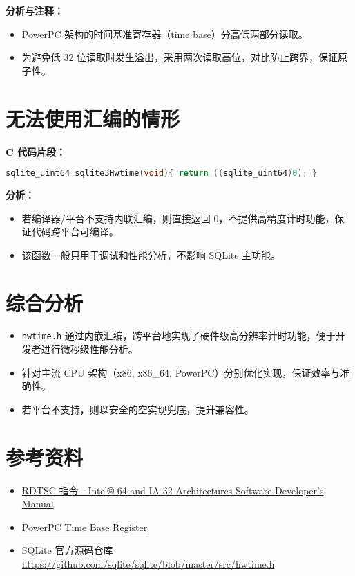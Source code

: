\documentclass[12pt]{article}
\begin{document}
\textbf{分析与注释：}
\begin{itemize}
    \item PowerPC 架构的时间基准寄存器（time base）分高低两部分读取。
    \item 为避免低 32 位读取时发生溢出，采用两次读取高位，对比防止跨界，保证原子性。
\end{itemize}

\section{无法使用汇编的情形}

\textbf{C 代码片段：}
\begin{lstlisting}[language=C]
sqlite_uint64 sqlite3Hwtime(void){ return ((sqlite_uint64)0); }
\end{lstlisting}

\textbf{分析：}
\begin{itemize}
    \item 若编译器/平台不支持内联汇编，则直接返回 0，不提供高精度计时功能，保证代码跨平台可编译。
    \item 该函数一般只用于调试和性能分析，不影响 SQLite 主功能。
\end{itemize}

\section{综合分析}

\begin{itemize}
    \item \texttt{hwtime.h} 通过内嵌汇编，跨平台地实现了硬件级高分辨率计时功能，便于开发者进行微秒级性能分析。
    \item 针对主流 CPU 架构（x86, x86\_64, PowerPC）分别优化实现，保证效率与准确性。
    \item 若平台不支持，则以安全的空实现兜底，提升兼容性。
\end{itemize}

\section{参考资料}
\begin{itemize}
    \item \href{https://www.intel.com/content/www/us/en/developer/articles/technical/intel-sdm.html}{RDTSC 指令 - Intel® 64 and IA-32 Architectures Software Developer’s Manual}
    \item \href{https://www.nxp.com/docs/en/application-note/AN3530.pdf}{PowerPC Time Base Register}
    \item SQLite 官方源码仓库 \url{https://github.com/sqlite/sqlite/blob/master/src/hwtime.h}
\end{itemize}
\end{document}
